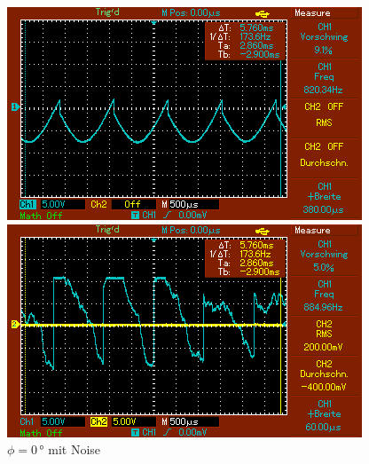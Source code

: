 \begin{figure}[h]
    \begin{minipage}[b]{.45\linewidth} %
       \includegraphics[width=\linewidth]{bilder/MAP007.png}
       \caption{$\phi = 120\,\unit{°}$}
    \end{minipage}
    \hspace{0.1\linewidth}%
    \begin{minipage}[b]{.45\linewidth} %
       \includegraphics[width=\linewidth]{bilder/MAP011.png}
       \caption{$\phi = 0\,\unit{°}$ mit Noise}
    \end{minipage}
\end{figure}

